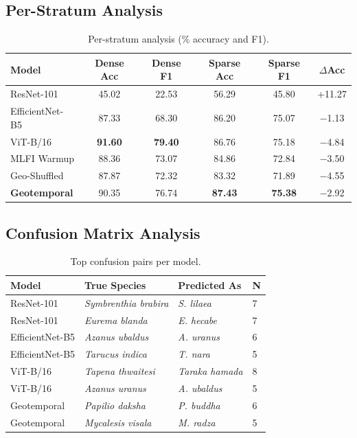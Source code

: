 \documentclass[runningheads]{llncs}
\begin{document}
\subsection{Per-Stratum Analysis}
\begin{table}[H]
    \centering
    \caption{Per-stratum analysis (\% accuracy and F1).}
    \small
    \begin{tabular}{@{}lccccc@{}}
        \toprule
        \textbf{Model} & \textbf{Dense Acc} & \textbf{Dense F1} & \textbf{Sparse Acc} & \textbf{Sparse F1} & \textbf{$\Delta$Acc} \\
        \midrule
        ResNet-101 & 45.02 & 22.53 & 56.29 & 45.80 & +11.27\\
        EfficientNet-B5 & 87.33 & 68.30 & 86.20 & 75.07 & $-$1.13\\
        ViT-B/16 & \textbf{91.60} & \textbf{79.40} & 86.76 & 75.18 & $-$4.84\\
        MLFI Warmup & 88.36 & 73.07 & 84.86 & 72.84 & $-$3.50\\
        Geo-Shuffled & 87.87 & 72.32 & 83.32 & 71.89 & $-$4.55\\
        \textbf{Geotemporal} & 90.35 & 76.74 & \textbf{87.43} & \textbf{75.38} & $-$2.92\\
        \bottomrule
    \end{tabular}
    \label{tab:per_stratum_analysis}
\end{table}
\subsection{Confusion Matrix Analysis} 
\begin{table}[H]
    \centering
    \caption{Top confusion pairs per model.}
    \small
    \begin{tabular}{@{}llll@{}}
        \toprule
        \textbf{Model} & \textbf{True Species} & \textbf{Predicted As} & \textbf{N} \\
        \midrule
 ResNet-101 & \textit{Symbrenthia brabira} & \textit{S. lilaea} & 7 \\
 ResNet-101 & \textit{Eurema blanda} & \textit{E. hecabe} & 7 \\
 EfficientNet-B5 & \textit{Azanus ubaldus} & \textit{A. uranus} & 6 \\
 EfficientNet-B5 & \textit{Tarucus indica} & \textit{T. nara} & 5 \\
 ViT-B/16 & \textit{Tapena thwaitesi} & \textit{Taraka hamada} & 8 \\
 ViT-B/16 & \textit{Azanus uranus} & \textit{A. ubaldus} & 5 \\
 Geotemporal & \textit{Papilio daksha} & \textit{P. buddha} & 6 \\
 Geotemporal & \textit{Mycalesis visala} & \textit{M. radza} & 5 \\
        \bottomrule
    \end{tabular}
    \label{tab:confusion_matrix_analysis}
\end{table}
\end{document}
